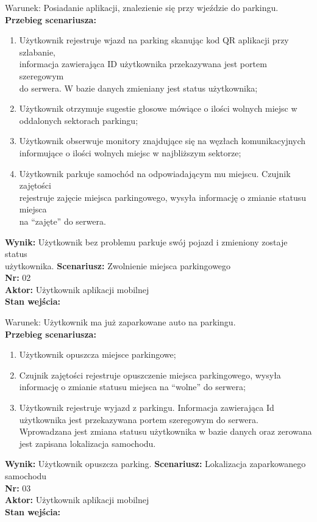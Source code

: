 \documentclass[12pt,a4paper]{article}
\begin{document}
Warunek: Posiadanie aplikacji, znalezienie się przy wjeździe do parkingu.
\\{\bf Przebieg scenariusza:}
\begin{enumerate}
\item Użytkownik rejestruje wjazd na parking skanując kod QR aplikacji przy szlabanie,\\informacja zawierająca ID użytkownika przekazywana jest portem szeregowym\\do serwera. W bazie danych zmieniany jest status użytkownika;
\item Użytkownik otrzymuje sugestie głosowe mówiące o ilości wolnych miejsc w oddalonych sektorach parkingu;
\item Użytkownik obserwuje monitory znajdujące się na węzłach komunikacyjnych\\informujące o ilości wolnych miejsc w najbliższym sektorze;
\item Użytkownik parkuje samochód  na odpowiadającym mu miejscu. Czujnik zajętości\\rejestruje zajęcie miejsca parkingowego, wysyła informację o zmianie statusu miejsca\\na “zajęte” do serwera.
\end{enumerate}
{\bf Wynik:} Użytkownik bez problemu parkuje swój pojazd i zmieniony zostaje status\\użytkownika.
\newline\newline
{\large \bf Scenariusz:} Zwolnienie miejsca parkingowego
\\{\bf Nr:} 02
\\{\bf Aktor:} Użytkownik aplikacji mobilnej
\\{\bf Stan wejścia:}

Warunek: Użytkownik ma już zaparkowane auto na parkingu.
\\{\bf Przebieg scenariusza:}
\begin{enumerate}
\item Użytkownik opuszcza miejsce parkingowe;
\item Czujnik zajętości rejestruje opuszczenie miejsca parkingowego, wysyła informację o zmianie statusu miejsca na “wolne” do serwera;
\item Użytkownik rejestruje wyjazd z parkingu. Informacja zawierająca Id użytkownika jest przekazywana portem szeregowym do serwera. Wprowadzana jest zmiana statusu użytkownika w bazie danych oraz zerowana jest zapisana lokalizacja samochodu.
\end{enumerate}
{\bf Wynik:} Użytkownik opuszcza parking.
\newline\newline\newline\newline\newline\newline\newline
{\large \bf Scenariusz:} Lokalizacja zaparkowanego samochodu
\\{\bf Nr:} 03
\\{\bf Aktor:} Użytkownik aplikacji mobilnej
\\{\bf Stan wejścia:}
\end{document}
